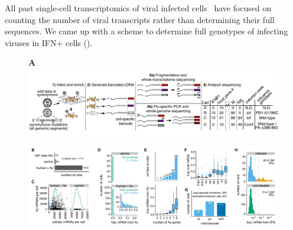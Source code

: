 \documentclass[9pt,lineno]{elife}
\begin{document}
All past single-cell transcriptomics of viral infected cells~\citep{russell2018extreme,zanini2018single,steuerman2018dissection,zanini2018virus} have focused on counting the number of viral transcripts rather than determining their full sequences.
We came up with a scheme to determine full genotypes of infecting viruses in IFN+ cells ().

\begin{figure}
\begin{fullwidth}

\hspace{0.04in} {\bf A} \includegraphics[width=0.9\linewidth, valign=t]{figures/WorkflowSchematic/SchematicForPaper.pdf}
\vspace{0.1in}

\includegraphics[width=\linewidth, clip=false]{figures/single_cell_figures/p_cell_summary.pdf}


\end{fullwidth}
\end{figure}
\end{document}
